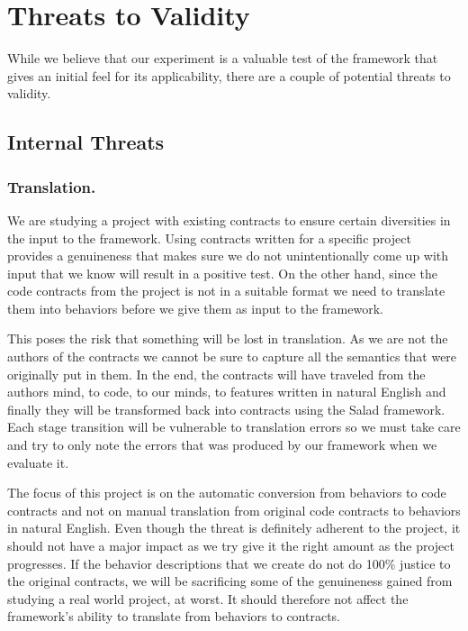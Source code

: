 \section{Threats to Validity}
\label{sec:Threats}
While we believe that our experiment is a valuable test of the framework that gives an initial feel for its applicability, there are a couple of potential threats to validity.

\subsection{Internal Threats}
\subsubsection{Translation.}
We are studying a project with existing contracts to ensure certain diversities in the input to the framework.
Using contracts written for a specific project provides a genuineness that makes sure we do not unintentionally come up with input that we know will result in a positive test.
On the other hand, since the code contracts from the project is not in a suitable format we need to translate them into behaviors before we give them as input to the framework.
 
This poses the risk that something will be lost in translation.
As we are not the authors of the contracts we cannot be sure to capture all the semantics that were originally put in them.
In the end, the contracts will have traveled from the authors mind, to code, to our minds, to features written in natural English and finally they will be transformed back into contracts using the Salad framework.
Each stage transition will be vulnerable to translation errors so we must take care and try to only note the errors that was produced by our framework when we evaluate it.
 
The focus of this project is on the automatic conversion from behaviors to code contracts and not on manual translation from original code contracts to behaviors in natural English. Even though the threat is definitely adherent to the project, it should not have a major impact as we try give it the right amount as the project progresses.
If the behavior descriptions that we create do not do 100\%  justice to the original contracts, we will be sacrificing some of the genuineness gained from studying a real world project, at worst. It should therefore not affect the framework's ability to translate from behaviors to contracts.

